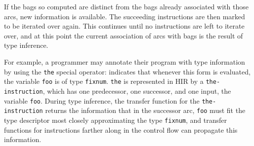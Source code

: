 If the bags so computed are distinct from the bags already associated with those arcs, new information is available. The succeeding instructions are then marked to be iterated over again. This continues until no instructions are left to iterate over, and at this point the current association of arcs with bags is the result of type inference.

For example, a \commonlisp{} programmer may annotate their program with type information by using the \texttt{the} special operator:  indicates that whenever this form is evaluated, the variable \texttt{foo} is of type \texttt{fixnum}. \texttt{the} is represented in HIR by a \texttt{the-instruction}, which has one predecessor, one successor, and one input, the variable \texttt{foo}. During type inference, the transfer function for the \texttt{the-instruction} returns the information that in the successor arc, \texttt{foo} must fit the type descriptor most closely approximating the \commonlisp{} type \texttt{fixnum}, and transfer functions for instructions farther along in the control flow can propagate this information.
